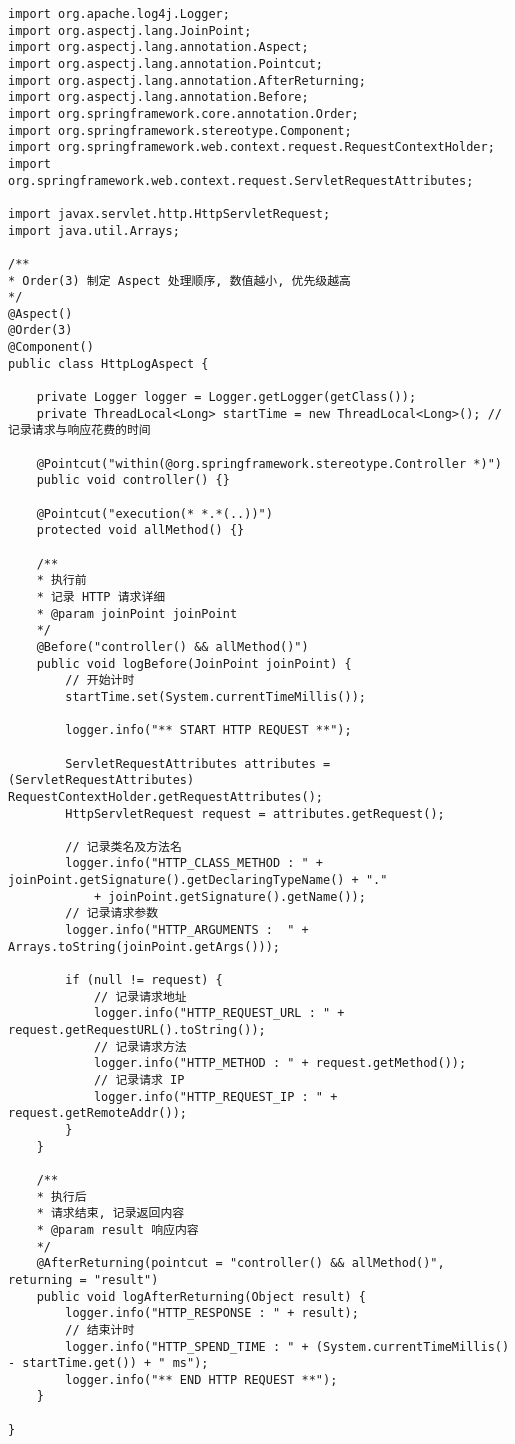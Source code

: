 \begin{lstlisting}
import org.apache.log4j.Logger;
import org.aspectj.lang.JoinPoint;
import org.aspectj.lang.annotation.Aspect;
import org.aspectj.lang.annotation.Pointcut;
import org.aspectj.lang.annotation.AfterReturning;
import org.aspectj.lang.annotation.Before;
import org.springframework.core.annotation.Order;
import org.springframework.stereotype.Component;
import org.springframework.web.context.request.RequestContextHolder;
import org.springframework.web.context.request.ServletRequestAttributes;

import javax.servlet.http.HttpServletRequest;
import java.util.Arrays;

/**
* Order(3) 制定 Aspect 处理顺序, 数值越小, 优先级越高
*/
@Aspect()
@Order(3)
@Component()
public class HttpLogAspect {

    private Logger logger = Logger.getLogger(getClass());
    private ThreadLocal<Long> startTime = new ThreadLocal<Long>(); // 记录请求与响应花费的时间

    @Pointcut("within(@org.springframework.stereotype.Controller *)")
    public void controller() {}

    @Pointcut("execution(* *.*(..))")
    protected void allMethod() {}

    /**
    * 执行前
    * 记录 HTTP 请求详细
    * @param joinPoint joinPoint
    */
    @Before("controller() && allMethod()")
    public void logBefore(JoinPoint joinPoint) {
        // 开始计时
        startTime.set(System.currentTimeMillis());

        logger.info("** START HTTP REQUEST **");

        ServletRequestAttributes attributes = (ServletRequestAttributes) RequestContextHolder.getRequestAttributes();
        HttpServletRequest request = attributes.getRequest();

        // 记录类名及方法名
        logger.info("HTTP_CLASS_METHOD : " + joinPoint.getSignature().getDeclaringTypeName() + "."
            + joinPoint.getSignature().getName());
        // 记录请求参数
        logger.info("HTTP_ARGUMENTS :  " + Arrays.toString(joinPoint.getArgs()));

        if (null != request) {
            // 记录请求地址
            logger.info("HTTP_REQUEST_URL : " + request.getRequestURL().toString());
            // 记录请求方法
            logger.info("HTTP_METHOD : " + request.getMethod());
            // 记录请求 IP
            logger.info("HTTP_REQUEST_IP : " + request.getRemoteAddr());
        }
    }

    /**
    * 执行后
    * 请求结束, 记录返回内容
    * @param result 响应内容
    */
    @AfterReturning(pointcut = "controller() && allMethod()", returning = "result")
    public void logAfterReturning(Object result) {
        logger.info("HTTP_RESPONSE : " + result);
        // 结束计时
        logger.info("HTTP_SPEND_TIME : " + (System.currentTimeMillis() - startTime.get()) + " ms");
        logger.info("** END HTTP REQUEST **");
    }

}
\end{lstlisting}


